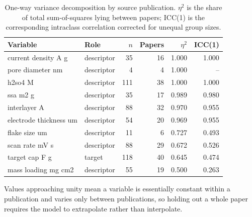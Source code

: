 \begin{table}[htbp]
\centering
\caption{One-way variance decomposition by source publication. $\eta^2$ is the share of total sum-of-squares lying between papers; ICC(1) is the corresponding intraclass correlation corrected for unequal group sizes.}
\label{tab:heterogeneity}
\footnotesize
\begin{tabular}{llrrrr}
\toprule
\textbf{Variable} & \textbf{Role} & \textbf{$n$} & \textbf{Papers} & \textbf{$\eta^2$} & \textbf{ICC(1)} \\
\midrule
current density A g & descriptor & 35 & 16 & 1.000 & 1.000 \\
pore diameter nm & descriptor & 4 & 4 & 1.000 & -- \\
h2so4 M & descriptor & 111 & 38 & 1.000 & 1.000 \\
ssa m2 g & descriptor & 35 & 17 & 0.989 & 0.980 \\
interlayer A & descriptor & 88 & 32 & 0.970 & 0.955 \\
electrode thickness um & descriptor & 54 & 20 & 0.969 & 0.955 \\
flake size um & descriptor & 11 & 6 & 0.727 & 0.493 \\
scan rate mV s & descriptor & 88 & 29 & 0.672 & 0.526 \\
target cap F g & target & 118 & 40 & 0.645 & 0.474 \\
mass loading mg cm2 & descriptor & 55 & 19 & 0.500 & 0.263 \\
\bottomrule
\end{tabular}
\par\vspace{2pt}\begin{minipage}{\linewidth}\scriptsize Values approaching unity mean a variable is essentially constant within a publication and varies only between publications, so holding out a whole paper requires the model to extrapolate rather than interpolate.\end{minipage}
\end{table}